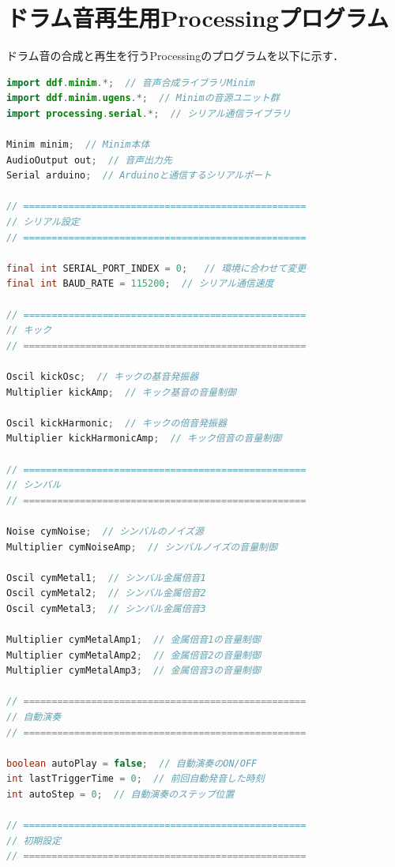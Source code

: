 \documentclass[uplatex,dvipdfmx]{jlreq}
\begin{document}
\section{ドラム音再生用Processingプログラム}
\label{sec:coded-pde}

ドラム音の合成と再生を行うProcessingのプログラムを以下に示す．

\begin{lstlisting}[language=Java]
import ddf.minim.*;  // 音声合成ライブラリMinim
import ddf.minim.ugens.*;  // Minimの音源ユニット群
import processing.serial.*;  // シリアル通信ライブラリ

Minim minim;  // Minim本体
AudioOutput out;  // 音声出力先
Serial arduino;  // Arduinoと通信するシリアルポート

// ==================================================
// シリアル設定
// ==================================================

final int SERIAL_PORT_INDEX = 0;   // 環境に合わせて変更
final int BAUD_RATE = 115200;  // シリアル通信速度

// ==================================================
// キック
// ==================================================

Oscil kickOsc;  // キックの基音発振器
Multiplier kickAmp;  // キック基音の音量制御

Oscil kickHarmonic;  // キックの倍音発振器
Multiplier kickHarmonicAmp;  // キック倍音の音量制御

// ==================================================
// シンバル
// ==================================================

Noise cymNoise;  // シンバルのノイズ源
Multiplier cymNoiseAmp;  // シンバルノイズの音量制御

Oscil cymMetal1;  // シンバル金属倍音1
Oscil cymMetal2;  // シンバル金属倍音2
Oscil cymMetal3;  // シンバル金属倍音3

Multiplier cymMetalAmp1;  // 金属倍音1の音量制御
Multiplier cymMetalAmp2;  // 金属倍音2の音量制御
Multiplier cymMetalAmp3;  // 金属倍音3の音量制御

// ==================================================
// 自動演奏
// ==================================================

boolean autoPlay = false;  // 自動演奏のON/OFF
int lastTriggerTime = 0;  // 前回自動発音した時刻
int autoStep = 0;  // 自動演奏のステップ位置

// ==================================================
// 初期設定
// ==================================================


\end{lstlisting}
\end{document}
